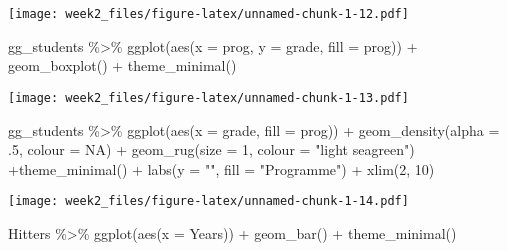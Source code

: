 \documentclass[
]{article}
\newenvironment{Shaded}{\begin{snugshade}}{\end{snugshade}}
\newcommand{\AttributeTok}[1]{\textcolor[rgb]{0.77,0.63,0.00}{#1}}
\newcommand{\ConstantTok}[1]{\textcolor[rgb]{0.00,0.00,0.00}{#1}}
\newcommand{\DecValTok}[1]{\textcolor[rgb]{0.00,0.00,0.81}{#1}}
\newcommand{\FunctionTok}[1]{\textcolor[rgb]{0.00,0.00,0.00}{#1}}
\newcommand{\NormalTok}[1]{#1}
\newcommand{\SpecialCharTok}[1]{\textcolor[rgb]{0.00,0.00,0.00}{#1}}
\newcommand{\StringTok}[1]{\textcolor[rgb]{0.31,0.60,0.02}{#1}}
\begin{document}
\texttt{[image: week2\_files/figure-latex/unnamed-chunk-1-12.pdf]}

\begin{Shaded}
\begin{Highlighting}[]
\NormalTok{  gg\_students }\SpecialCharTok{\%\textgreater{}\%} 
    \FunctionTok{ggplot}\NormalTok{(}\FunctionTok{aes}\NormalTok{(}\AttributeTok{x =}\NormalTok{ prog, }\AttributeTok{y =}\NormalTok{ grade, }\AttributeTok{fill =}\NormalTok{ prog)) }\SpecialCharTok{+} \FunctionTok{geom\_boxplot}\NormalTok{() }\SpecialCharTok{+} \FunctionTok{theme\_minimal}\NormalTok{()}
\end{Highlighting}
\end{Shaded}

\texttt{[image: week2\_files/figure-latex/unnamed-chunk-1-13.pdf]}

\begin{Shaded}
\begin{Highlighting}[]
\NormalTok{  gg\_students }\SpecialCharTok{\%\textgreater{}\%} 
    \FunctionTok{ggplot}\NormalTok{(}\FunctionTok{aes}\NormalTok{(}\AttributeTok{x =}\NormalTok{ grade, }\AttributeTok{fill =}\NormalTok{ prog)) }\SpecialCharTok{+} \FunctionTok{geom\_density}\NormalTok{(}\AttributeTok{alpha =}\NormalTok{ .}\DecValTok{5}\NormalTok{, }\AttributeTok{colour =} \ConstantTok{NA}\NormalTok{) }\SpecialCharTok{+} \FunctionTok{geom\_rug}\NormalTok{(}\AttributeTok{size =} \DecValTok{1}\NormalTok{, }\AttributeTok{colour =} \StringTok{"light seagreen"}\NormalTok{) }\SpecialCharTok{+}\FunctionTok{theme\_minimal}\NormalTok{() }\SpecialCharTok{+}
    \FunctionTok{labs}\NormalTok{(}\AttributeTok{y =} \StringTok{""}\NormalTok{, }\AttributeTok{fill =} \StringTok{"Programme"}\NormalTok{) }\SpecialCharTok{+} \FunctionTok{xlim}\NormalTok{(}\DecValTok{2}\NormalTok{, }\DecValTok{10}\NormalTok{)}
\end{Highlighting}
\end{Shaded}

\texttt{[image: week2\_files/figure-latex/unnamed-chunk-1-14.pdf]}

\begin{Shaded}
\begin{Highlighting}[]
\NormalTok{  Hitters }\SpecialCharTok{\%\textgreater{}\%}
    \FunctionTok{ggplot}\NormalTok{(}\FunctionTok{aes}\NormalTok{(}\AttributeTok{x =}\NormalTok{ Years)) }\SpecialCharTok{+} \FunctionTok{geom\_bar}\NormalTok{() }\SpecialCharTok{+} \FunctionTok{theme\_minimal}\NormalTok{()}
\end{Highlighting}
\end{Shaded}
\end{document}
